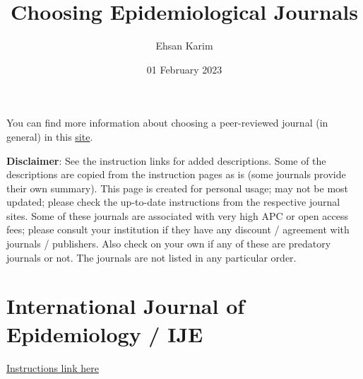 \documentclass[
  12pt,
]{article}
\title{Choosing Epidemiological Journals}
\author{Ehsan Karim}
\date{01 February 2023}
\begin{document}
\maketitle

{
\setcounter{tocdepth}{2}
\tableofcontents
}

You can find more information about choosing a peer-reviewed journal (in
general) in this
\href{https://ehsanx.github.io/Scientific-Writing-for-Health-Research/finding-suitable-journals.html}{site}.

\textbf{Disclaimer}: See the instruction links for added descriptions.
Some of the descriptions are copied from the instruction pages as is
(some journals provide their own summary). This page is created for
personal usage; may not be most updated; please check the up-to-date
instructions from the respective journal sites. Some of these journals
are associated with very high APC or open access fees; please consult
your institution if they have any discount / agreement with journals /
publishers. Also check on your own if any of these are predatory
journals or not. The journals are not listed in any particular order.

\hypertarget{international-journal-of-epidemiology-ije}{%
\section*{International Journal of Epidemiology /
IJE}\label{international-journal-of-epidemiology-ije}}

\href{https://academic.oup.com/ije/pages/General_Instructions}{Instructions
link here}
\end{document}
